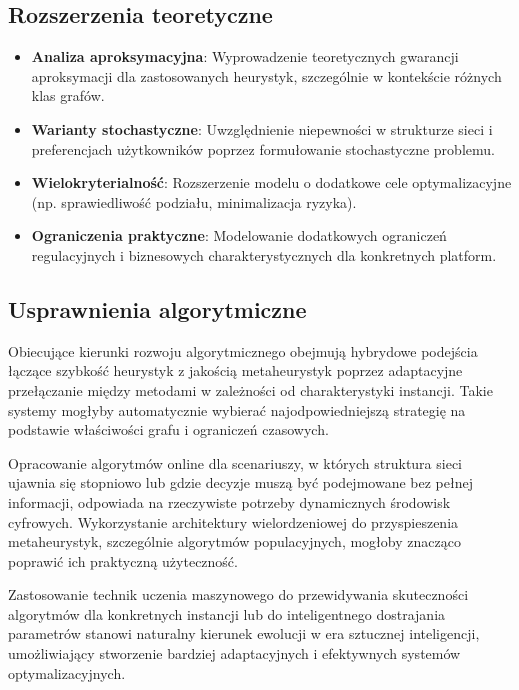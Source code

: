 \subsection{Rozszerzenia teoretyczne}

\begin{itemize}
  \item \textbf{Analiza aproksymacyjna}: Wyprowadzenie teoretycznych gwarancji aproksymacji dla zastosowanych heurystyk, szczególnie w kontekście różnych klas grafów.

  \item \textbf{Warianty stochastyczne}: Uwzględnienie niepewności w strukturze sieci i preferencjach użytkowników poprzez formułowanie stochastyczne problemu.

  \item \textbf{Wielokryterialność}: Rozszerzenie modelu o dodatkowe cele optymalizacyjne (np. sprawiedliwość podziału, minimalizacja ryzyka).

  \item \textbf{Ograniczenia praktyczne}: Modelowanie dodatkowych ograniczeń regulacyjnych i biznesowych charakterystycznych dla konkretnych platform.
\end{itemize}

\subsection{Usprawnienia algorytmiczne}

Obiecujące kierunki rozwoju algorytmicznego obejmują hybrydowe podejścia łączące szybkość heurystyk z jakością metaheurystyk poprzez adaptacyjne przełączanie między metodami w zależności od charakterystyki instancji. Takie systemy mogłyby automatycznie wybierać najodpowiedniejszą strategię na podstawie właściwości grafu i ograniczeń czasowych.

Opracowanie algorytmów online dla scenariuszy, w których struktura sieci ujawnia się stopniowo lub gdzie decyzje muszą być podejmowane bez pełnej informacji, odpowiada na rzeczywiste potrzeby dynamicznych środowisk cyfrowych. Wykorzystanie architektury wielordzeniowej do przyspieszenia metaheurystyk, szczególnie algorytmów populacyjnych, mogłoby znacząco poprawić ich praktyczną użyteczność.

Zastosowanie technik uczenia maszynowego do przewidywania skuteczności algorytmów dla konkretnych instancji lub do inteligentnego dostrajania parametrów stanowi naturalny kierunek ewolucji w era sztucznej inteligencji, umożliwiający stworzenie bardziej adaptacyjnych i efektywnych systemów optymalizacyjnych.

